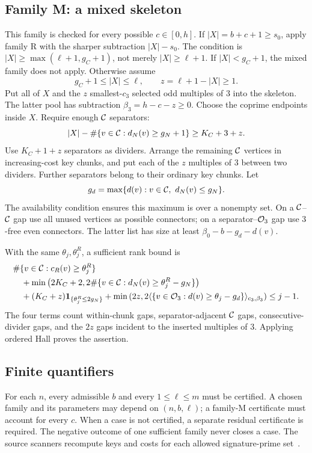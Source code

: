 \subsection{Family M: a mixed skeleton}
This family is checked for every possible $c\in[0,h]$. If $|X|=b+c+1\ge s_0$, apply family R with the sharper subtraction $|X|-s_0$. The condition is $|X|\ge\max(\ell+1,g_C+1)$, not merely $|X|\ge\ell+1$.
If $|X|<g_C+1$, the mixed family does not apply. Otherwise assume
\[
 g_C+1\le |X|\le\ell,\qquad z=\ell+1-|X|\ge1.
\]
Put all of $X$ and the $z$ smallest-$c_3$ selected odd multiples of $3$ into the skeleton. The latter pool has subtraction $\beta_3=h-c-z\ge0$. Choose the coprime endpoints inside $X$. Require enough $\mathcal C$ separators:
\[
 |X|-\#\{v\in\mathcal C:d_N(v)\ge g_N+1\}\ge K_C+3+z.
\]
Use $K_C+1+z$ separators as dividers. Arrange the remaining $\mathcal C$ vertices in increasing-cost key chunks, and put each of the $z$ multiples of $3$ between two dividers. Further separators belong to their ordinary key chunks. Let
\[
 g_d=\max\{d(v):v\in\Cset,\ d_N(v)\le g_N\}.
\]
The availability condition ensures this maximum is over a nonempty set. On a $\mathcal C$--$\mathcal C$ gap use all unused vertices as possible connectors; on a separator--$\mathcal O_3$ gap use $3$-free even connectors. The latter list has size at least $\beta_0-b-g_d-d(v)$.

With the same $\theta_j,\theta_j^R$, a sufficient rank bound is
\begin{align}\label{eq:Mcert}
 &\#\{v\in\mathcal C:c_R(v)\ge\theta_j^R\}\nonumber\\
 &\quad+\min\left(2K_C+2,2\#\{v\in\mathcal C:d_N(v)\ge\theta_j^R-g_N\}\right)\nonumber\\
 &\quad+(K_C+z)\mathbf 1_{\{\theta_j^R\le2g_N\}}
 +\min\left(2z,2\langle\{v\in\mathcal O_3:d(v)\ge\theta_j-g_d\}\rangle_{c_3,\beta_3}\right)
 \le j-1.
\end{align}
The four terms count within-chunk gaps, separator-adjacent $\mathcal C$ gaps, consecutive-divider gaps, and the $2z$ gaps incident to the inserted multiples of $3$. Applying ordered Hall proves the assertion.

\subsection{Finite quantifiers}
For each $n$, every admissible $b$ and every $1\le\ell\le m$ must be certified. A chosen family and its parameters may depend on $(n,b,\ell)$; a family-M certificate must account for every $c$. When a case is not certified, a separate residual certificate is required. The negative outcome of one sufficient family never closes a case. The source scanners recompute keys and costs for each allowed signature-prime set~\cite{Archive}.

